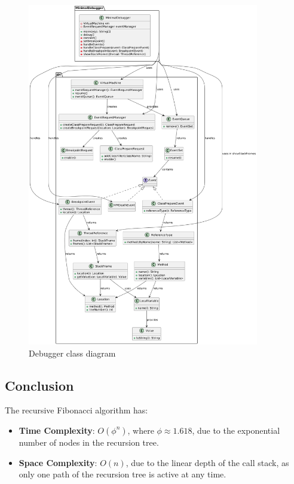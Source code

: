 \documentclass{article}
\begin{document}
\begin{figure}[H]
	\centering
	\includegraphics[width=0.9\textwidth]{./fibonacci-debugger/diagrams/class/DebuggerClass.png}
	\caption{Debugger class diagram}
	\label{fig:debugger_class_diagram}
\end{figure}


\subsection{Conclusion}
The recursive Fibonacci algorithm has:
\begin{itemize}
	\item \textbf{Time Complexity}: \( O(\phi^n) \), where \( \phi \approx 1.618 \), due to the exponential number of nodes in the recursion tree.
	\item \textbf{Space Complexity}: \( O(n) \), due to the linear depth of the call stack, as only one path of the recursion tree is active at any time.
\end{itemize}
\end{document}
